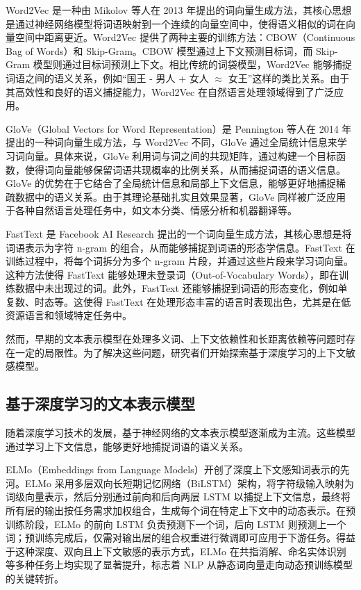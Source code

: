\documentclass[12pt, a4paper]{ctexart}
\begin{document}
Word2Vec 是一种由 Mikolov 等人在 2013 年提出的词向量生成方法，其核心思想是通过神经网络模型将词语映射到一个连续的向量空间中，使得语义相似的词在向量空间中距离更近\cite{mikolov2013efficientestimationwordrepresentations}。Word2Vec 提供了两种主要的训练方法：CBOW（Continuous Bag of Words）和 Skip-Gram。CBOW 模型通过上下文预测目标词，而 Skip-Gram 模型则通过目标词预测上下文。相比传统的词袋模型，Word2Vec 能够捕捉词语之间的语义关系，例如“国王 - 男人 + 女人 $\approx$ 女王”这样的类比关系。由于其高效性和良好的语义捕捉能力，Word2Vec 在自然语言处理领域得到了广泛应用。

GloVe（Global Vectors for Word Representation）是 Pennington 等人在 2014 年提出的一种词向量生成方法，与 Word2Vec 不同，GloVe 通过全局统计信息来学习词向量\cite{pennington-etal-2014-glove}。具体来说，GloVe 利用词与词之间的共现矩阵，通过构建一个目标函数，使得词向量能够保留词语共现概率的比例关系，从而捕捉词语的语义信息。GloVe 的优势在于它结合了全局统计信息和局部上下文信息，能够更好地捕捉稀疏数据中的语义关系。由于其理论基础扎实且效果显著，GloVe 同样被广泛应用于各种自然语言处理任务中，如文本分类、情感分析和机器翻译等。

FastText 是 Facebook AI Research 提出的一个词向量生成方法，其核心思想是将词语表示为字符 n-gram 的组合，从而能够捕捉到词语的形态学信息\cite{bojanowski2017enrichingwordvectorssubword}。FastText 在训练过程中，将每个词拆分为多个 n-gram 片段，并通过这些片段来学习词向量。这种方法使得 FastText 能够处理未登录词（Out-of-Vocabulary Words），即在训练数据中未出现过的词。此外，FastText 还能够捕捉到词语的形态变化，例如单复数、时态等。这使得 FastText 在处理形态丰富的语言时表现出色，尤其是在低资源语言和领域特定任务中。

然而，早期的文本表示模型在处理多义词、上下文依赖性和长距离依赖等问题时存在一定的局限性。为了解决这些问题，研究者们开始探索基于深度学习的上下文敏感模型。

\subsection{基于深度学习的文本表示模型}

随着深度学习技术的发展，基于神经网络的文本表示模型逐渐成为主流。这些模型通过学习上下文信息，能够更好地捕捉词语的语义关系。

ELMo（Embeddings from Language Models）开创了深度上下文感知词表示的先河\cite{peters2018deepcontextualizedwordrepresentations}。ELMo 采用多层双向长短期记忆网络（BiLSTM）架构，将字符级输入映射为词级向量表示，然后分别通过前向和后向两层 LSTM 以捕捉上下文信息，最终将所有层的输出按任务需求加权组合，生成每个词在特定上下文中的动态表示。在预训练阶段，ELMo 的前向 LSTM 负责预测下一个词，后向 LSTM 则预测上一个词；预训练完成后，仅需对输出层的组合权重进行微调即可应用于下游任务。得益于这种深度、双向且上下文敏感的表示方式，ELMo 在共指消解、命名实体识别等多种任务上均实现了显著提升，标志着 NLP 从静态词向量走向动态预训练模型的关键转折。
\end{document}
